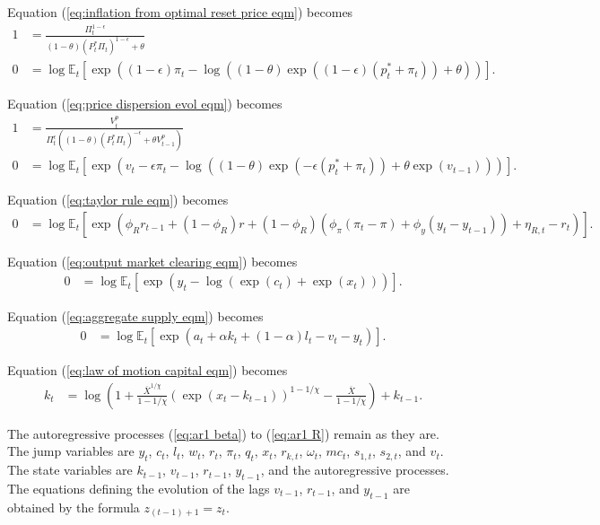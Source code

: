 \documentclass[12 pt, oneside]{article}
\theoremstyle{definition}
\theoremstyle{definition}
\theoremstyle{definition}
\newcommand{\E}{\mathbb{E}}
\begin{document}
Equation (\ref{eq:inflation from optimal reset price eqm}) becomes
\begin{align*}
  1 & = \frac{\Pi_t^{1 - \epsilon}}{(1 - \theta)(P_t^*\Pi_t)^{1 - \epsilon} + \theta}\\
  0 & = \log\E_t\left[\exp\left((1 - \epsilon)\pi_t - \log((1 - \theta) \exp((1 - \epsilon)(p_t^* + \pi_t)) + \theta)\right)\right].
\end{align*}

Equation (\ref{eq:price dispersion evol eqm}) becomes
\begin{align*}
  1 & = \frac{V_t^p}{\Pi_t^\epsilon((1 - \theta) (P_t^*\Pi_t)^{-\epsilon} + \theta V_{t - 1}^p)}\\
  0 & = \log\E_t\left[\exp\left(v_t - \epsilon \pi_t - \log((1 - \theta) \exp(-\epsilon(p_t^* + \pi_t)) + \theta \exp(v_{t - 1}))\right)\right].
\end{align*}

Equation (\ref{eq:taylor rule eqm}) becomes
\begin{align*}
  0 & = \log\E_t\left[\exp\left(\phi_R r_{t - 1} + (1 - \phi_R)r + (1 - \phi_R)(\phi_\pi(\pi_t - \pi) + \phi_y(y_t - y_{t - 1})) + \eta_{R, t} - r_t\right)\right].
\end{align*}

Equation (\ref{eq:output market clearing eqm}) becomes
\begin{align*}
  0 & = \log\E_t\left[\exp(y_t - \log(\exp(c_t) + \exp(x_t)))\right].
\end{align*}

Equation (\ref{eq:aggregate supply eqm}) becomes
\begin{align*}
  0 & = \log\E_t\left[\exp(a_t + \alpha k_t + (1 - \alpha)l_t - v_t - y_t)\right].
\end{align*}

Equation (\ref{eq:law of motion capital eqm}) becomes
\begin{align*}
  k_t & = \log\left(1 + \frac{\overline{X}^{1 / \chi}}{1 - 1 / \chi}(\exp(x_t - k_{t - 1}))^{1 - 1 / \chi} - \frac{\overline{X}}{1 - 1 / \chi} \right) + k_{t - 1}.
\end{align*}

The autoregressive processes (\ref{eq:ar1 beta}) to (\ref{eq:ar1 R}) remain as they are.\\

The jump variables are $y_t$, $c_t$, $l_t$, $w_t$, $r_t$, $\pi_t$, $q_t$, $x_t$, $r_{k, t}$, $\omega_t$, $mc_t$, $s_{1, t}$, $s_{2, t}$, and $v_t$.
The state variables are $k_{t - 1}$, $v_{t - 1}$, $r_{t - 1}$, $y_{t - 1}$, and the autoregressive processes. The equations defining the evolution of the lags $v_{t - 1}$, $r_{t - 1}$, and $y_{t - 1}$ are obtained by the formula $z_{(t - 1) + 1} = z_t$.
\end{document}

